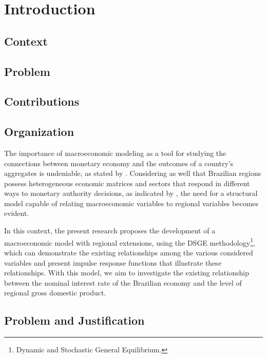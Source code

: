 \documentclass[../thesis.tex]{subfiles}
\begin{document}
	\newpage
	
	\section{Introduction}\label{sec:introduction}
	
	\subsection*{Context}
	
	\subsection*{Problem}
	
	\subsection*{Contributions}
	
	\subsection*{Organization}	
	
	The importance of macroeconomic modeling as a tool for studying the connections between monetary economy and the outcomes of a country's aggregates is undeniable, as stated by \textcite{gali_monetary_2015}. Considering as well that Brazilian regions possess heterogeneous economic matrices and sectors that respond in different ways to monetary authority decisions, as indicated by \textcite{bertanha_efeitos_2008}, the need for a structural model capable of relating macroeconomic variables to regional variables becomes evident.
	
	In this context, the present research proposes the development of a macroeconomic model with regional extensions, using the DSGE methodology\footnote{Dynamic and Stochastic General Equilibrium.}, which can demonstrate the existing relationships among the various considered variables and present impulse response functions that illustrate these relationships. With this model, we aim to investigate the existing relationship between the nominal interest rate of the Brazilian economy and the level of regional gross domestic product.
	
	\subsection*{Problem and Justification}
	
\end{document}
